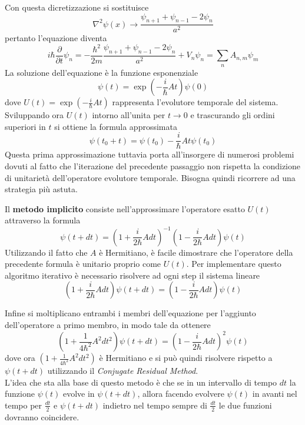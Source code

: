 Con questa dicretizzazione si sostituisce
$$\nabla^2\psi(x) \rightarrow \frac{\psi_{n+1}+\psi_{n-1}-2\psi_n}{a^2} $$
pertanto l'equazione diventa
$$i\hbar\frac{\partial}{\partial t} \psi_n = -\frac{\hbar^2}{2m}\frac{\psi_{n+1}+\psi_{n-1}-2\psi_n}{a^2} + V_n\psi_n = \sum\limits_{n}A_{n,m}\psi_m$$
La soluzione dell'equazione è la funzione esponenziale
$$\psi(t)=\exp(-\frac{i}{\hbar}At)\psi(0)$$
dove $U(t) = \exp(-\frac{i}{\hbar}At)$ rappresenta l'evolutore temporale del sistema. Sviluppando ora $U(t)$ intorno all'unita per $t\rightarrow 0$ e trascurando gli ordini superiori in $t$ si ottiene la formula approssimata
$$\psi(t_0+t)=\psi(t_0)-\frac{i}{\hbar}At\psi(t_0)$$
Questa prima approssimazione tuttavia porta all'insorgere di numerosi problemi dovuti al fatto che l'iterazione del precedente passaggio non rispetta la condizione di unitarietà dell'operatore evolutore temporale. Bisogna quindi ricorrere ad una strategia più astuta.

Il \textbf{metodo implicito} consiste nell'approssimare l'operatore esatto $U(t)$ attraverso la formula
$$\psi(t+dt)=(1+\frac{i}{2\hbar}Adt)^{-1}(1-\frac{i}{2\hbar}Adt)\psi(t)$$
Utilizzando il fatto che $A$ è Hermitiano, è facile dimostrare che l'operatore della precedente formula è unitario proprio come $U(t)$.
Per implementare questo algoritmo iterativo è necessario risolvere ad ogni step il sistema lineare
$$(1+\frac{i}{2\hbar}Adt)\psi(t+dt)=(1-\frac{i}{2\hbar}Adt)\psi(t)$$

Infine si moltiplicano entrambi i membri dell'equazione per l'aggiunto dell'operatore a primo membro, in modo tale da ottenere
$$(1+\frac{1}{4\hbar^2}A^2dt^2)\psi(t+dt)=(1-\frac{i}{2\hbar}Adt)^2\psi(t)$$
dove ora $(1+\frac{1}{4\hbar^2}A^2dt^2)$ è Hermitiano e si può quindi risolvere rispetto a $\psi(t+dt)$ utilizzando il \textit{Conjugate Residual Method}.\\

L'idea che sta alla base di questo metodo è che se in un intervallo di tempo $dt$ la funzione $\psi(t)$ evolve in $\psi(t+dt)$, allora facendo evolvere $\psi(t)$ in avanti nel tempo per $\frac{dt}{2}$ e $\psi(t+dt)$ indietro nel tempo sempre di $\frac{dt}{2}$ le due funzioni dovranno coincidere.

